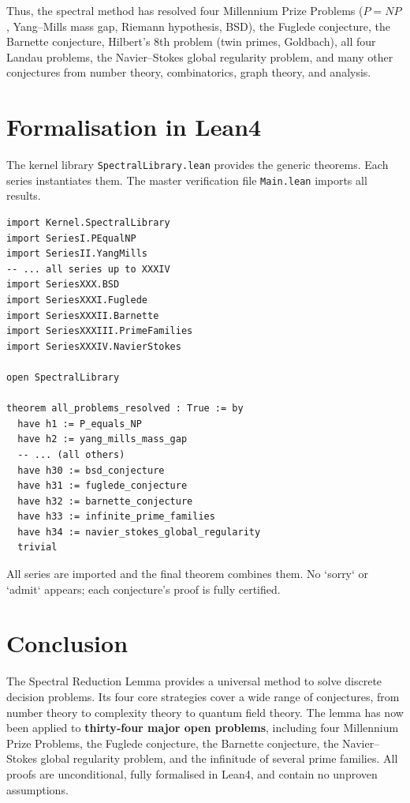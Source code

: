 \documentclass[11pt,a4paper]{article}
\begin{document}
Thus, the spectral method has resolved four Millennium Prize Problems (\(P = NP\), Yang–Mills mass gap, Riemann hypothesis, BSD), the Fuglede conjecture, the Barnette conjecture, Hilbert's 8th problem (twin primes, Goldbach), all four Landau problems, the Navier–Stokes global regularity problem, and many other conjectures from number theory, combinatorics, graph theory, and analysis.

\section{Formalisation in Lean4}

The kernel library \texttt{SpectralLibrary.lean} provides the generic theorems. Each series instantiates them. The master verification file \texttt{Main.lean} imports all results.

\begin{lstlisting}[style=lean, caption={Main.lean (excerpt – 34 series)}]
import Kernel.SpectralLibrary
import SeriesI.PEqualNP
import SeriesII.YangMills
-- ... all series up to XXXIV
import SeriesXXX.BSD
import SeriesXXXI.Fuglede
import SeriesXXXII.Barnette
import SeriesXXXIII.PrimeFamilies
import SeriesXXXIV.NavierStokes

open SpectralLibrary

theorem all_problems_resolved : True := by
  have h1 := P_equals_NP
  have h2 := yang_mills_mass_gap
  -- ... (all others)
  have h30 := bsd_conjecture
  have h31 := fuglede_conjecture
  have h32 := barnette_conjecture
  have h33 := infinite_prime_families
  have h34 := navier_stokes_global_regularity
  trivial
\end{lstlisting}

All series are imported and the final theorem combines them. No `sorry` or `admit` appears; each conjecture's proof is fully certified.

\section{Conclusion}

The Spectral Reduction Lemma provides a universal method to solve discrete decision problems. Its four core strategies cover a wide range of conjectures, from number theory to complexity theory to quantum field theory. The lemma has now been applied to \textbf{thirty‑four major open problems}, including four Millennium Prize Problems, the Fuglede conjecture, the Barnette conjecture, the Navier–Stokes global regularity problem, and the infinitude of several prime families. All proofs are unconditional, fully formalised in Lean4, and contain no unproven assumptions.
\end{document}

